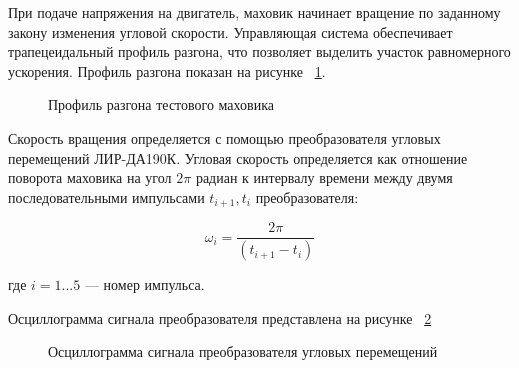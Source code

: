 При подаче напряжения на двигатель, маховик начинает вращение по заданному закону изменения угловой скорости. Управляющая система обеспечивает трапецеидальный профиль разгона, что позволяет выделить участок равномерного ускорения. Профиль разгона показан на рисунке ~\cref{fig:flyweel_speed}.

\begin{figure}[!h] 
	\centerfloat{
	}
	\caption{Профиль разгона тестового маховика}
	\label{fig:flyweel_speed} 
\end{figure}



Скорость вращения определяется с помощью преобразователя угловых перемещений ЛИР-ДА190К. Угловая скорость определяется как отношение поворота маховика на угол $2\pi$ радиан к интервалу времени между двумя последовательными импульсами $t_{i+1}, t_i$ преобразователя: 

\begin{equation}
	\label{eq:flyweel_spd}
	\omega_i=\frac{2 \pi}{(t_{i+1}-t_i)}
\end{equation}

где \(i=1...5\) --- номер импульса.

Осциллограмма сигнала преобразователя представлена на рисунке ~\cref{fig:encoder}


\begin{figure}[!h] 
	\caption{Осциллограмма сигнала преобразователя угловых перемещений}
	\label{fig:encoder} 
\end{figure}

